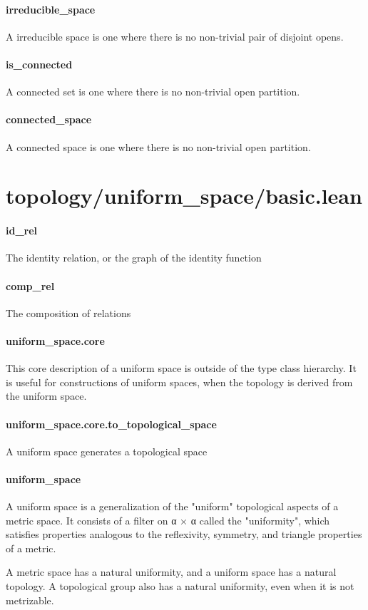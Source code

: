\documentclass{article}
\begin{document}
\paragraph{irreducible\_space}
\par
A irreducible space is one where there is no non-trivial pair of disjoint opens.
\paragraph{is\_connected}
\par
A connected set is one where there is no non-trivial open partition.
\paragraph{connected\_space}
\par
A connected space is one where there is no non-trivial open partition.
\section{topology/uniform\_space/basic.lean}\paragraph{id\_rel}
\par
The identity relation, or the graph of the identity function
\paragraph{comp\_rel}
\par
The composition of relations
\paragraph{uniform\_space.core}
\par
This core description of a uniform space is outside of the type class hierarchy. It is useful
for constructions of uniform spaces, when the topology is derived from the uniform space.
\paragraph{uniform\_space.core.to\_topological\_space}
\par
A uniform space generates a topological space
\paragraph{uniform\_space}
\par
A uniform space is a generalization of the "uniform" topological aspects of a
metric space. It consists of a filter on 
\colorbox[RGB]{253,246,227}{{{{\color[RGB]{101, 123, 131} α × α }}}} called the "uniformity", which
satisfies properties analogous to the reflexivity, symmetry, and triangle properties
of a metric.
\par
A metric space has a natural uniformity, and a uniform space has a natural topology.
A topological group also has a natural uniformity, even when it is not metrizable.
\end{document}

